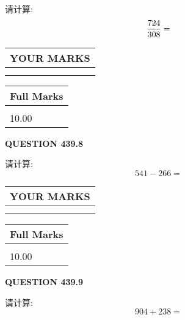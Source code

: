 \documentclass{ctexart}
\begin{document}
  
 
请计算:
\begin{equation}
\frac { %
724 }  {  %
308} = \nonumber
\end{equation}
 

 

 
  
\vspace{0.2in}
  
\noindent\begin{tabular}{|l|}
\hline
 YOUR MARKS  \\
\hline
 \\ 
 \\ 
\hline
\end{tabular}
\hspace{0.05in} \begin{tabular}{|l|}
\hline
 Full Marks  \\
\hline
 \\ 
10.00 \\
\hline
\end{tabular}
{\textbf{\Large{QUESTION
439.8 
}}}
  
  
 
请计算:
\begin{equation}
541 -   %
266 = \nonumber
\end{equation}
 

 

 
  
\vspace{0.2in}
  
\noindent\begin{tabular}{|l|}
\hline
 YOUR MARKS  \\
\hline
 \\ 
 \\ 
\hline
\end{tabular}
\hspace{0.05in} \begin{tabular}{|l|}
\hline
 Full Marks  \\
\hline
 \\ 
10.00 \\
\hline
\end{tabular}
{\textbf{\Large{QUESTION
439.9 
}}}
  
  
 
请计算:
\begin{equation}
904 +  %
238 = \nonumber
\end{equation}
 

 

 
  
\end{document}
